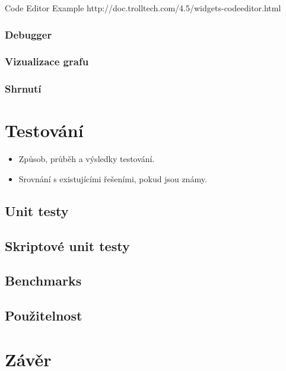 \documentclass[11pt,twoside,a4paper]{book}
\begin{document}
Code Editor Example
http://doc.trolltech.com/4.5/widgets-codeeditor.html

\subsection{Debugger}

\subsection{Vizualizace grafu}

\subsection{Shrnutí}




\chapter{Testování}

\begin{itemize}
 \item Způsob, průběh a výsledky testování.
 \item Srovnání s existujícími řešeními, pokud jsou známy.
\end{itemize}

\section{Unit testy}

\section{Skriptové unit testy}

\section{Benchmarks}

\section{Použitelnost}



\chapter{Závěr}
\end{document}
